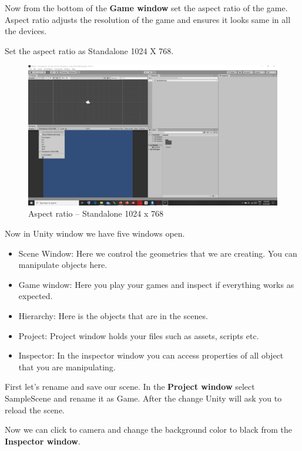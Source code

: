 \documentclass[
]{book}
\providecommand{\tightlist}{%
  \setlength{\itemsep}{0pt}\setlength{\parskip}{0pt}}
\begin{document}
Now from the bottom of the \textbf{Game window} set the aspect ratio of the game. Aspect ratio adjusts the resolution of the game and ensures it looks same in all the devices.

Set the aspect ratio as Standalone 1024 X 768.

\begin{figure}
\centering
\includegraphics{Images/aspectRatio.png}
\caption{Aspect ratio -- Standalone 1024 x 768}
\end{figure}

Now in Unity window we have five windows open.

\begin{itemize}
\tightlist
\item
  Scene Window: Here we control the geometries that we are creating. You can manipulate objects here.
\item
  Game window: Here you play your games and inspect if everything works as expected.
\item
  Hierarchy: Here is the objects that are in the scenes.
\item
  Project: Project window holds your files such as assets, scripts etc.
\item
  Inspector: In the inspector window you can access properties of all object that you are manipulating.
\end{itemize}

First let's rename and save our scene. In the \textbf{Project window} select SampleScene and rename it as Game. After the change Unity will ask you to reload the scene.

Now we can click to camera and change the background color to black from the \textbf{Inspector window}.
\end{document}
